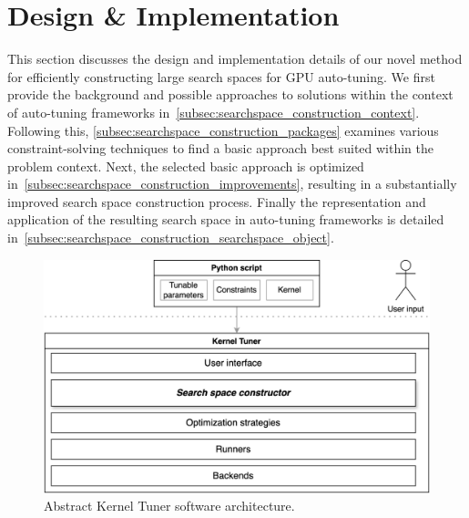 \section{Design \& Implementation}
\label{sec:searchspace_construction}
This section discusses the design and implementation details of our novel method for efficiently constructing large search spaces for GPU auto-tuning. 
We first provide the background and possible approaches to solutions within the context of auto-tuning frameworks in~\cref{subsec:searchspace_construction_context}. 
Following this, \cref{subsec:searchspace_construction_packages} examines various constraint-solving techniques to find a basic approach best suited within the problem context. 
Next, the selected basic approach is optimized in~\cref{subsec:searchspace_construction_improvements}, resulting in a substantially improved search space construction process.
Finally the representation and application of the resulting search space in auto-tuning frameworks is detailed in~\cref{subsec:searchspace_construction_searchspace_object}. 

\begin{figure}[htb]
    \centering
    \includegraphics[width=\linewidth]{ics25template/figures/kt_architecture_simplified.png}
    \caption{Abstract Kernel Tuner software architecture.}
    \label{fig:kernel-tuner-architecture}
\end{figure}

